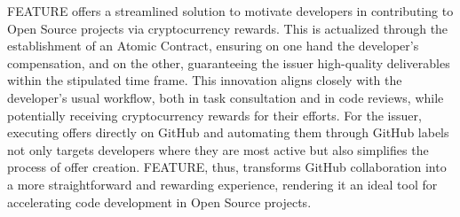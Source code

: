 \documentclass[
	a4paper, %
	10pt, %
	unnumberedsections, %
	twoside, %
]{LTJournalArticle}
\begin{document}
FEATURE offers a streamlined solution to motivate developers in contributing to Open Source projects via cryptocurrency rewards. This is actualized through the establishment of an Atomic Contract, ensuring on one hand the developer's compensation, and on the other, guaranteeing the issuer high-quality deliverables within the stipulated time frame. This innovation aligns closely with the developer's usual workflow, both in task consultation and in code reviews, while potentially receiving cryptocurrency rewards for their efforts. For the issuer, executing offers directly on GitHub and automating them through GitHub labels not only targets developers where they are most active but also simplifies the process of offer creation. FEATURE, thus, transforms GitHub collaboration into a more straightforward and rewarding experience, rendering it an ideal tool for accelerating code development in Open Source projects.
\end{document}
